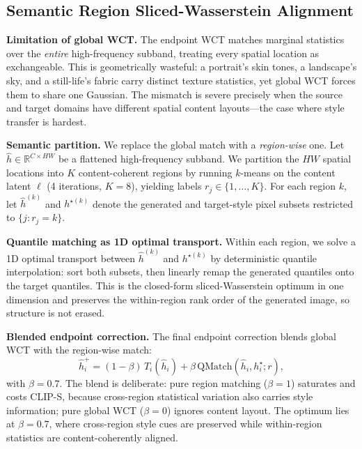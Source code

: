 \documentclass[letterpaper]{article}
\begin{document}
\subsection{Semantic Region Sliced-Wasserstein Alignment}
\label{sec:semswd}

\textbf{Limitation of global WCT.}
The endpoint WCT matches marginal statistics over the \emph{entire} high-frequency subband, treating every spatial location as exchangeable.
This is geometrically wasteful: a portrait's skin tones, a landscape's sky, and a still-life's fabric carry distinct texture statistics, yet global WCT forces them to share one Gaussian.
The mismatch is severe precisely when the source and target domains have different spatial content layouts---the case where style transfer is hardest.

\textbf{Semantic partition.}
We replace the global match with a \emph{region-wise} one.
Let $\hat h \in \mathbb R^{C\times HW}$ be a flattened high-frequency subband.
We partition the $HW$ spatial locations into $K$ content-coherent regions by running $k$-means on the content latent $\ell$ (4 iterations, $K{=}8$), yielding labels $r_j\in\{1,\ldots,K\}$.
For each region $k$, let $\hat h^{(k)}$ and $h^{\star(k)}$ denote the generated and target-style pixel subsets restricted to $\{j:r_j=k\}$.

\textbf{Quantile matching as 1D optimal transport.}
Within each region, we solve a 1D optimal transport between $\hat h^{(k)}$ and $h^{\star(k)}$ by deterministic quantile interpolation: sort both subsets, then linearly remap the generated quantiles onto the target quantiles.
This is the closed-form sliced-Wasserstein optimum in one dimension and preserves the within-region rank order of the generated image, so structure is not erased.

\textbf{Blended endpoint correction.}
The final endpoint correction blends global WCT with the region-wise match:
\begin{equation}
\hat h_i^{+} = (1-\beta)\,T_i(\hat h_i) + \beta\,\mathrm{QMatch}(\hat h_i, h_i^\star; r),
\label{eq:semswd}
\end{equation}
with $\beta=0.7$.
The blend is deliberate: pure region matching ($\beta{=}1$) saturates and costs CLIP-S, because cross-region statistical variation also carries style information; pure global WCT ($\beta{=}0$) ignores content layout.
The optimum lies at $\beta{=}0.7$, where cross-region style cues are preserved while within-region statistics are content-coherently aligned.
\end{document}
